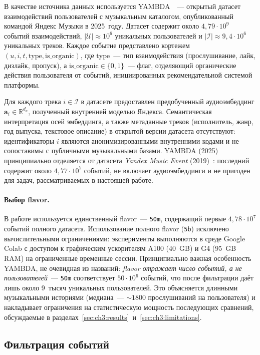 В качестве источника данных используется YAMBDA~\cite{yambda2025}~--- открытый датасет взаимодействий пользователей с музыкальным каталогом, опубликованный командой Яндекс Музыки в 2025~году. Датасет содержит около $4{,}79 \cdot 10^9$ событий взаимодействий, $|\mathcal{U}| \approx 10^6$ уникальных пользователей и $|\mathcal{I}| \approx 9{,}4 \cdot 10^6$ уникальных треков. Каждое событие представлено кортежем $(u, i, t, \mathrm{type}, \mathrm{is\_organic})$, где $\mathrm{type}$~--- тип взаимодействия (прослушивание, лайк, дизлайк, пропуск), а $\mathrm{is\_organic} \in \{0, 1\}$~--- флаг, отделяющий органические действия пользователя от событий, инициированных рекомендательной системой платформы.

Для каждого трека $i \in \mathcal{I}$ в датасете предоставлен предобученный аудиоэмбеддинг $\mathbf{a}_i \in \mathbb{R}^{d_a}$, полученный внутренней моделью Яндекса. Семантическая интерпретация осей эмбеддинга, а также метаданные треков (исполнитель, жанр, год выпуска, текстовое описание) в открытой версии датасета отсутствуют: идентификаторы $i$ являются анонимизированными внутренними кодами и не сопоставимы с публичными музыкальными базами. YAMBDA (2025) принципиально отделяется от датасета \emph{Yandex Music Event} (2019)~\cite{abbattista2024sequential}: последний содержит около $4{,}77 \cdot 10^7$ событий, не включает аудиоэмбеддинги и не пригоден для задач, рассматриваемых в настоящей работе.

\paragraph{Выбор flavor.} В работе используется единственный flavor~--- \texttt{50m}, содержащий первые $4{,}78 \cdot 10^7$ событий полного датасета. Использование полного flavor (\texttt{5b}) исключено вычислительными ограничениями: эксперименты выполняются в среде Google Colab с доступом к графическим ускорителям A100 (40~GB) и G4 (95~GB RAM) на ограниченные временные сессии. Принципиально важная особенность YAMBDA, не очевидная из названий: \emph{flavor отражает число событий, а не пользователей}~--- \texttt{50m} соответствует $50 \cdot 10^6$ событий, что после фильтрации даёт лишь около 9~тысяч уникальных пользователей. Это объясняется длинными музыкальными историями (медиана~--- $\sim\!1800$ прослушиваний на пользователя) и накладывает ограничения на статистическую мощность последующих сравнений, обсуждаемые в разделах~\ref{sec:ch3:results}~и~\ref{sec:ch3:limitations}.

\subsection{Фильтрация событий}\label{subsec:ch3:filter}

